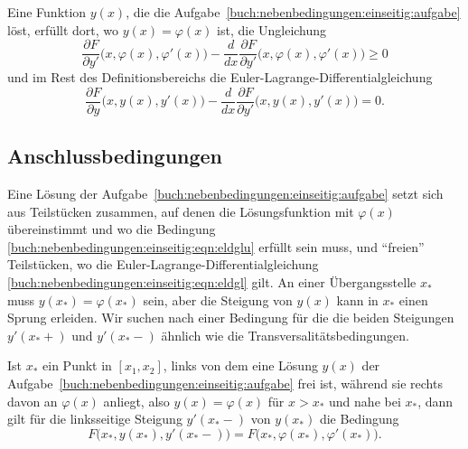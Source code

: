 \begin{satz}
\label{buch:nebenbedingungen:einseitig:satz:elungleichung}
Eine Funktion $y(x)$, die die
Aufgabe~\ref{buch:nebenbedingungen:einseitig:aufgabe}
löst, erfüllt dort, wo $y(x)=\varphi(x)$ ist, die Ungleichung
%
%
\begin{equation}
\frac{\partial F}{\partial y'}\bigl(x,\varphi(x),\varphi'(x)\bigr)
-
\frac{d}{dx}\frac{\partial F}{\partial y'}\bigl(x,\varphi(x),\varphi'(x)\bigr)
\ge
0
\label{buch:nebenbedingungen:einseitig:eqn:eldglu}
\end{equation}
und im Rest des Definitionsbereichs die Euler-Lagrange-Differentialgleichung
\begin{equation}
\frac{\partial F}{\partial y}\bigl(x,y(x),y'(x)\bigr)
-
\frac{d}{dx}
\frac{\partial F}{\partial y'}\bigl(x,y(x),y'(x)\bigr)
=
0.
\label{buch:nebenbedingungen:einseitig:eqn:eldgl}
\end{equation}
\end{satz}

%
%
\subsection{Anschlussbedingungen
\label{buch:nebenbedingungen:einseitig:subsection:anschluss}}

Eine Lösung der
Aufgabe~\ref{buch:nebenbedingungen:einseitig:aufgabe}
setzt sich aus Teilstücken zusammen, auf denen die Lösungsfunktion mit
$\varphi(x)$ übereinstimmt und wo die Bedingung
\eqref{buch:nebenbedingungen:einseitig:eqn:eldglu}
erfüllt sein muss, und ``freien'' Teilstücken, wo die
Euler-Lagrange-Differentialgleichung
\eqref{buch:nebenbedingungen:einseitig:eqn:eldgl} gilt.
An einer Übergangsstelle $x_*$ muss $y(x_*)=\varphi(x_*)$ sein,
aber die Steigung von $y(x)$ kann in $x_*$ einen Sprung
erleiden.
Wir suchen nach einer Bedingung für die die beiden Steigungen 
$y'(x_*+)$ und $y'(x_*-)$ ähnlich wie die Transversalitätsbedingungen.
%

\begin{satz}[Anschlussbedingungen]
\label{buch:nebenbedingungen:einseitig:satz:anschlussbedingungen}
Ist $x_*$ ein Punkt in $[x_1,x_2]$, links von dem eine Lösung $y(x)$ der
Aufgabe~\ref{buch:nebenbedingungen:einseitig:aufgabe}
frei ist, während sie rechts davon an $\varphi(x)$ anliegt, also
$y(x) = \varphi(x)$ für $x>x_*$ und nahe bei $x_*$, dann gilt
für die linksseitige Steigung $y'(x_*-)$ von $y(x_*)$ die
Bedingung
\[
F\bigl(x_*,y(x_*),y'(x_*-)\bigr) = F\bigl(x_*,\varphi(x_*),\varphi'(x_*)\bigr).
\]
\end{satz}

